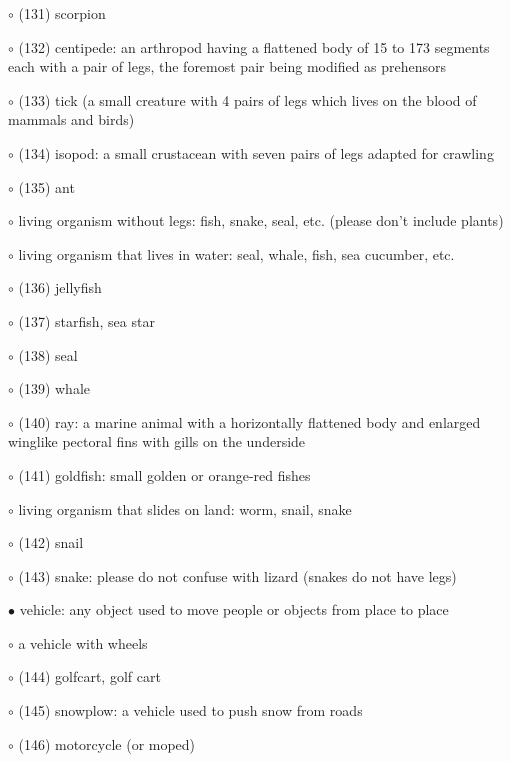 \noindent \leftskip=0.75cm $\circ$ (131) scorpion

\noindent \leftskip=0.75cm $\circ$ (132) centipede: an arthropod having a flattened body of 15 to 173 segments each with a pair of legs, the foremost pair being modified as prehensors

\noindent \leftskip=0.75cm $\circ$ (133) tick (a small creature with 4 pairs of legs which lives on the blood of mammals and birds)

\noindent \leftskip=0.75cm $\circ$ (134) isopod: a small crustacean with seven pairs of legs adapted for crawling

\noindent \leftskip=0.75cm $\circ$ (135) ant

\noindent \leftskip=0.5cm $\circ$ living organism without legs: fish, snake, seal, etc. (please don't include plants)

\noindent \leftskip=0.75cm $\circ$ living organism that lives in water: seal, whale, fish, sea cucumber, etc.

\noindent \leftskip=1.0cm $\circ$ (136) jellyfish

\noindent \leftskip=1.0cm $\circ$ (137) starfish, sea star

\noindent \leftskip=1.0cm $\circ$ (138) seal

\noindent \leftskip=1.0cm $\circ$ (139) whale

\noindent \leftskip=1.0cm $\circ$ (140) ray: a marine animal with a horizontally flattened body and enlarged winglike pectoral fins with gills on the underside

\noindent \leftskip=1.0cm $\circ$ (141) goldfish: small golden or orange-red fishes

\noindent \leftskip=0.75cm $\circ$ living organism that slides on land: worm, snail, snake

\noindent \leftskip=1.0cm $\circ$ (142) snail

\noindent \leftskip=1.0cm $\circ$ (143) snake: please do not confuse with lizard (snakes do not have legs)

\noindent \leftskip=0.0cm $\bullet$ vehicle: any object used to move people or objects from place to place

\noindent \leftskip=0.25cm $\circ$ a vehicle with wheels

\noindent \leftskip=0.5cm $\circ$ (144) golfcart, golf cart

\noindent \leftskip=0.5cm $\circ$ (145) snowplow: a vehicle used to push snow from roads

\noindent \leftskip=0.5cm $\circ$ (146) motorcycle (or moped)

